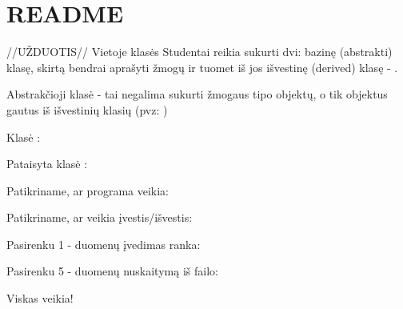 \chapter{README}
\hypertarget{md__c_1_2_darbai_22___o_p_22___o_p_2_r_e_a_d_m_e}{}\label{md__c_1_2_darbai_22___o_p_22___o_p_2_r_e_a_d_m_e}
//\+UŽ\+DUOTIS// Vietoje klasės Studentai reikia sukurti dvi\+: bazinę (abstrakti) klasę, skirtą bendrai aprašyti žmogų ir tuomet iš jos išvestinę (derived) klasę -\/ .

Abstrakčioji klasė -\/ tai negalima sukurti žmogaus tipo objektų, o tik objektus gautus iš išvestinių klasių (pvz\+: )

Klasė \+:



Pataisyta klasė \+:





Patikriname, ar programa veikia\+:



Patikriname, ar veikia įvestis/išvestis\+:

Pasirenku 1 -\/ duomenų įvedimas ranka\+:



Pasirenku 5 -\/ duomenų nuskaitymą iš failo\+:



Viskas veikia! 